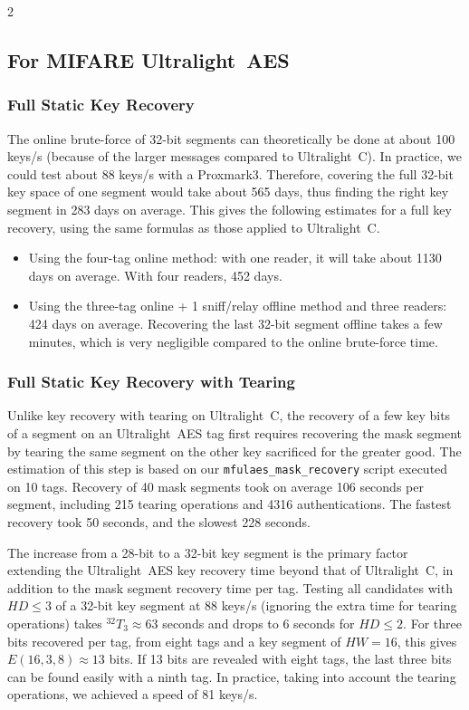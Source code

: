 \documentclass[10pt,letterpaper]{article}
\begin{document}
\begin{multicols}{2}
\subsection{For MIFARE Ultralight~AES}
\label{sec:estimate_ulaes}

\subsubsection*{Full Static Key Recovery}
The online brute-force of 32-bit segments can theoretically be done at about 100 keys/s (because of the larger messages compared to Ultralight~C). In practice, we could test about 88 keys/s with a Proxmark3. Therefore, covering the full 32-bit key space of one segment would take about 565 days, thus finding the right key segment in 283 days on average. This gives the following estimates for a full key recovery, using the same formulas as those applied to Ultralight~C.
\begin{itemize}
    \item Using the four-tag online method: with one reader, it will take about 1130 days on average. With four readers, 452 days.
    \item Using the three-tag online + 1 sniff/relay offline method and three readers: 424 days on average. Recovering the last 32-bit segment offline takes a few minutes, which is very negligible compared to the online brute-force time.
\end{itemize}

\subsubsection*{Full Static Key Recovery with Tearing}
Unlike key recovery with tearing on Ultralight~C, the recovery of a few key bits of a segment on an Ultralight~AES tag first requires recovering the mask segment by tearing the same segment on the other key sacrificed for the greater good. The estimation of this step is based on our \texttt{mfulaes\_mask\_recovery} script executed on 10 tags. Recovery of 40 mask segments took on average 106 seconds per segment, including 215 tearing operations and 4316 authentications. The fastest recovery took 50 seconds, and the slowest 228 seconds.

The increase from a 28-bit to a 32-bit key segment is the primary factor extending the Ultralight~AES key recovery time beyond that of Ultralight~C, in addition to the mask segment recovery time per tag.
Testing all candidates with $HD \leq 3$ of a 32-bit key segment at 88 keys/s (ignoring the extra time for tearing operations) takes ${}^{32}T_{3}\approx 63$ seconds and drops to 6 seconds for $HD \leq 2$.
For three bits recovered per tag, from eight tags and a key segment of $HW=16$, this gives $E(16,3,8) \approx 13$ bits.
If 13 bits are revealed with eight tags, the last three bits can be found easily with a ninth tag.
In practice, taking into account the tearing operations, we achieved a speed of 81 keys/s.


\end{multicols}
\end{document}
